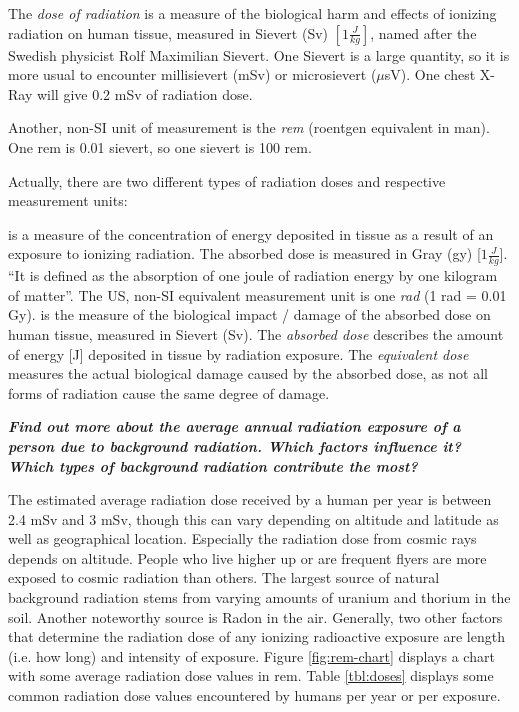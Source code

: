 The \emph{dose of radiation} is a measure of the biological harm and effects of ionizing radiation on human tissue, measured in Sievert (Sv) $[1\frac{J}{kg}]$, named after the Swedish physicist Rolf Maximilian Sievert. One Sievert is a large quantity, so it is more usual to encounter millisievert (mSv) or microsievert ($\mu$sV). One chest X-Ray will give 0.2 mSv of radiation dose.

Another, non-SI unit of measurement is the \emph{rem} (roentgen equivalent in man). One rem is 0.01 sievert, so one sievert is 100 rem.

Actually, there are two different types of radiation doses and respective measurement units:

\begin{itemize}
	 is a measure of the concentration of energy deposited in tissue as a result of an exposure to ionizing radiation. The absorbed dose is measured in Gray (gy) [$1\frac{J}{kg}$]. ``It is defined as the absorption of one joule of radiation energy by one kilogram of matter''. The US, non-SI equivalent measurement unit is one \emph{rad} (1 rad = 0.01 Gy).
	 is the measure of the biological impact / damage of the absorbed dose on human tissue, measured in Sievert (Sv). The \emph{absorbed dose} describes the amount of energy [J] deposited in tissue by radiation exposure. The \emph{equivalent dose} measures the actual biological damage caused by the absorbed dose, as not all forms of radiation cause the same degree of damage.
\end{itemize}

\pagebreak

\textbf{\emph{Find out more about the average annual radiation exposure of a person due to background radiation. Which factors influence it? Which types of background radiation contribute the most?}}

The estimated average radiation dose received by a human per year is between 2.4 mSv and 3 mSv, though this can vary depending on altitude and latitude as well as geographical location. Especially the radiation dose from cosmic rays depends on altitude. People who live higher up or are frequent flyers are more exposed to cosmic radiation than others. The largest source of natural background radiation stems from varying amounts of uranium and thorium in the soil. Another noteworthy source is Radon in the air. Generally, two other factors that determine the radiation dose of any ionizing radioactive exposure are length (i.e. how long) and intensity of exposure. Figure \ref{fig:rem-chart} displays a chart with some average radiation dose values in rem. Table \ref{tbl:doses} displays some common radiation dose values encountered by humans per year or per exposure.

